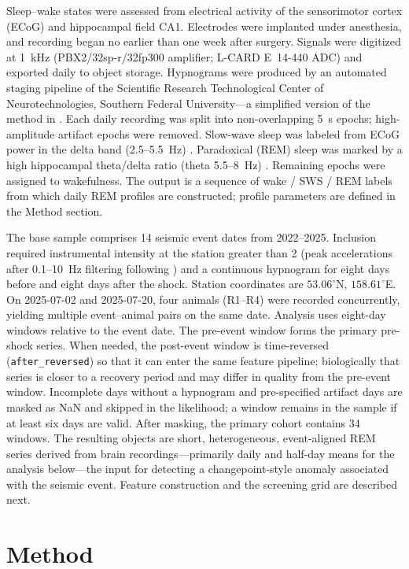 Sleep–wake states were assessed from electrical activity of the sensorimotor cortex (ECoG) and hippocampal field CA1. Electrodes were implanted under anesthesia, and recording began no earlier than one week after surgery. Signals were digitized at 1~kHz (PBX2/32sp-r/32fp300 amplifier; L-CARD E~14-440 ADC) and exported daily to object storage. Hypnograms were produced by an automated staging pipeline of the Scientific Research Technological Center of Neurotechnologies, Southern Federal University---a simplified version of the method in \cite{Saevskiy2025}. Each daily recording was split into non-overlapping 5~s epochs; high-amplitude artifact epochs were removed. Slow-wave sleep was labeled from ECoG power in the delta band (2.5–5.5~Hz) \cite{Fang2010}. Paradoxical (REM) sleep was marked by a high hippocampal theta/delta ratio (theta 5.5–8~Hz) \cite{Fang2010,Saevskiy2025}. Remaining epochs were assigned to wakefulness. The output is a sequence of wake / SWS / REM labels from which daily REM profiles are constructed; profile parameters are defined in the Method section.

The base sample comprises 14 seismic event dates from 2022–2025. Inclusion required instrumental intensity at the station greater than 2 (peak accelerations after 0.1–10~Hz filtering following \cite{GOST2017}) and a continuous hypnogram for eight days before and eight days after the shock. Station coordinates are \(53.06^{\circ}\)N, \(158.61^{\circ}\)E. On 2025-07-02 and 2025-07-20, four animals (R1–R4) were recorded concurrently, yielding multiple event–animal pairs on the same date. Analysis uses eight-day windows relative to the event date. The pre-event window forms the primary pre-shock series. When needed, the post-event window is time-reversed (\texttt{after\_reversed}) so that it can enter the same feature pipeline; biologically that series is closer to a recovery period and may differ in quality from the pre-event window. Incomplete days without a hypnogram and pre-specified artifact days are masked as NaN and skipped in the likelihood; a window remains in the sample if at least six days are valid. After masking, the primary cohort contains 34 windows. The resulting objects are short, heterogeneous, event-aligned REM series derived from brain recordings---primarily daily and half-day means for the analysis below---the input for detecting a changepoint-style anomaly associated with the seismic event. Feature construction and the screening grid are described next.
\fi

\section{Method}

